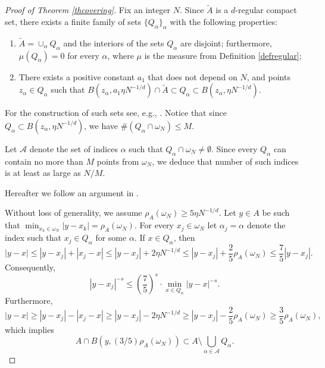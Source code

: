 \documentclass[12pt]{amsart}
\theoremstyle{definition}
\newcommand{\1}{\mathbf{1}}
\begin{document}
\begin{proof}[Proof of Theorem \ref{thcovering}]
Fix an integer $N$. Since $\tilde{A}$ is a $d$-regular compact set, there exists %
a finite family of sets $\{Q_\alpha\}_{\alpha}$ with the following properties:
\begin{enumerate}
\item $\tilde{A}=\cup_\alpha Q_\alpha$ and the interiors of the sets $Q_\alpha$ are disjoint; furthermore, $\mu(Q_\alpha)=0$ for every $\alpha$, where $\mu$ is the measure from Definition \ref{defregular};
\item There exists a positive constant $a_1$ that does not depend on $N$, and points $z_\alpha\in Q_\alpha$ such that $B(z_\alpha, a_1\eta N^{-1/d})\cap \tilde{A}\subset Q_\alpha \subset B(z_\alpha, \eta N^{-1/d})$. 
\end{enumerate}
For the construction of such sets see, e.g., \cite{Christ1990}. 
 Notice that since $Q_\alpha \subset B(z_\alpha, \eta N^{-1/d})$, we have $\#(Q_\alpha\cap \omega_N )\leqslant M$.

Let $\mathcal{A}$ denote the set of indices $\alpha$ such that $Q_\alpha\cap \omega_N\not=\emptyset$. Since every $Q_\alpha$ can contain no more than $M$ points from $\omega_N$, we deduce that number of such indices is at least as large as $N/M$. 

Hereafter we follow an argument in \cite{Hardin2012}.

Without loss of generality, we assume $\rho_A(\omega_N)\geqslant 5\eta N^{-1/d}$.
Let $y\in A$ be such that $\min_{x_k\in \omega_N} |y-x_k|=\rho_A(\omega_N)$. For every $x_j\in \omega_N$ let $\alpha_j=\alpha$ denote the index such that $x_j\in Q_\alpha$ for some $\alpha$. If $x\in Q_\alpha$, then
$$
|y-x|\leqslant |y-x_j|+|x_j-x|\leqslant |y-x_j|+2\eta N^{-1/d}\leqslant |y-x_j|+\frac25\rho_A(\omega_N)\leqslant \frac75|y-x_j|.
$$
Consequently, 
\begin{equation}\label{anotherequationnnnn}
|y-x_j|^{-s}\leqslant \left(\frac75\right)^s \cdot \min_{x\in Q_\alpha} |y-x|^{-s}. 
\end{equation}
Furthermore, 
$$
|y-x|\geqslant |y-x_j|-|x_j-x|\geqslant |y-x_j|-2\eta N^{-1/d}\geqslant |y-x_j|-\frac25 \rho_A(\omega_N)\geqslant \frac35 \rho_A(\omega_N),
$$
which implies
$$
A\cap B(y, (3/5) \rho_A(\omega_N))\subset A\setminus \bigcup_{\alpha\in\mathcal{A}}Q_\alpha.
$$



\end{proof}
\end{document}
